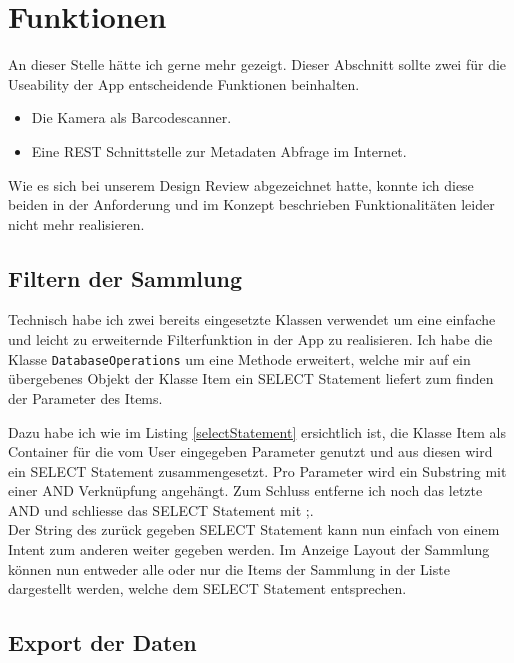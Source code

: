 \section{Funktionen}

An dieser Stelle hätte ich gerne mehr gezeigt. Dieser Abschnitt sollte zwei für die Useability der App entscheidende Funktionen beinhalten. 

\begin{itemize}
	\item Die Kamera als Barcodescanner.
	\item Eine REST Schnittstelle zur Metadaten Abfrage im Internet.
\end{itemize}

Wie es sich bei unserem Design Review abgezeichnet hatte, konnte ich diese beiden in der Anforderung und im Konzept beschrieben Funktionalitäten leider nicht mehr realisieren.

\subsection{Filtern der Sammlung}

Technisch habe ich zwei bereits eingesetzte Klassen verwendet um eine einfache und leicht zu erweiternde Filterfunktion in der App zu realisieren. Ich habe die Klasse \texttt{DatabaseOperations} um eine Methode erweitert, welche mir auf ein übergebenes Objekt der Klasse Item ein SELECT Statement liefert zum finden der Parameter des Items.



Dazu habe ich wie im Listing \ref{selectStatement} ersichtlich ist, die Klasse Item als Container für die vom User eingegeben Parameter genutzt und aus diesen wird ein SELECT Statement zusammengesetzt. Pro Parameter wird ein Substring mit einer AND Verknüpfung angehängt. Zum Schluss entferne ich noch das letzte AND und schliesse das SELECT Statement mit \glqq;\grqq.\\

Der String des zurück gegeben SELECT Statement kann nun einfach von einem Intent zum anderen weiter gegeben werden. Im Anzeige Layout der Sammlung können nun entweder alle oder nur die Items der Sammlung in der Liste dargestellt werden, welche dem SELECT Statement entsprechen.

\subsection{Export der Daten}

